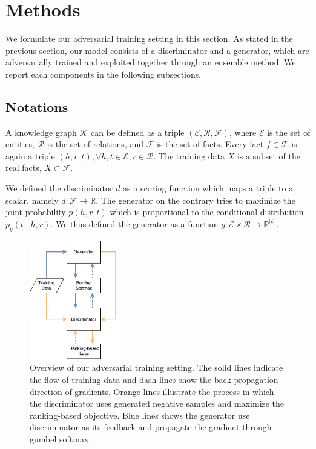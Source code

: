 \documentclass[twocolumn,a4paper,10pt,preprint,3p]{elsarticle}
\begin{document}
\section{Methods}

We formulate our adversarial training setting in this section. As stated in the previous section, our model consists of a discriminator and a generator, which are adversarially trained and exploited together through an ensemble method. We report each components in the following subsections.

\subsection{Notations}

A knowledge graph $\mathcal{K}$ can be defined as a triple $(\mathcal{E}, \mathcal{R}, \mathcal{F})$, where $\mathcal{E}$ is the set of entities, $\mathcal{R}$ is the set of relations, and $\mathcal{F}$ is the set of facts. Every fact $f\in \mathcal{F}$ is again a triple $(h, r, t), \forall h,t\in\mathcal{E}, r\in\mathcal{R}$. The training data $X$ is a subset of the real facts, $X \subset \mathcal{F}$.

We defined the discriminator $d$ as a scoring function which maps a triple to a scalar, namely $d: \mathcal{F}\rightarrow \mathbb{R}$. The generator on the contrary tries to maximize the joint probability $p(h, r, t)$ which is proportional to the conditional distribution $p_g(t \mid h, r)$. We thus defined the generator as a function $g: \mathcal{E} \times \mathcal{R} \rightarrow \mathbb{R}^{\lvert \mathcal{E} \rvert}$.

\begin{figure}[t]
    \centering
    \includegraphics[width=0.35\textwidth]{images/overview.pdf}
    \caption{Overview of our adversarial training setting. The solid lines indicate the flow of training data and dash lines show the back propagation direction of gradients. Orange lines illustrate the process in which the discriminator uses generated negative samples and maximize the ranking-based objective. Blue lines shows the generator use discriminator as its feedback and propagate the gradient through gumbel softmax~\cite{GumbelSoftmax_Jiang_2016}.}
\label{system-overview}
\end{figure}
\end{document}

